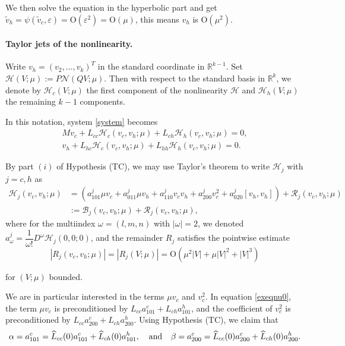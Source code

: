 \documentclass[10pt]{article}
\newcommand{\R}{\mathbb{R}}
\newcommand{\rmO}{\mathrm{O}}
\newcommand{\eps}{\varepsilon}
\newcommand{\Nl}{\mathcal{N}}
\newcommand{\B}{\mathcal{B}}
\newcommand{\Rm}{\mathcal{R}}
\begin{document}
We then solve the equation in the hyperbolic part and get $\tilde{v}_h = \psi(\tilde{v}_c,\eps) = \rmO(\eps^2)=\rmO(\mu)$, this means $v_h$ is $\rmO(\mu^2)$.
\fi

\paragraph{Taylor jets of the nonlinearity.} 
Write $v_h = (v_2,\ldots,v_{k})^T$ in the standard coordinate in $\R^{k-1}$. Set $\mathcal{H}(V;\mu) :=P\Nl(QV;\mu)$. Then with respect to the standard basis in $\R^k$, we denote by $\mathcal{H}_c(V;\mu)$ the first component of the nonlinearity $\mathcal{H}$ and $\mathcal{H}_h(V;\mu)$ the remaining $k-1$ components. 

In this notation, system \eqref{system} becomes
\begin{align}
M v_c + L_{cc}\mathcal{H}_c(v_c,v_h;\mu) + L_{ch}\mathcal{H}_h(v_c,v_h;\mu)= 0\label{exeqnu0},\\
v_h +  L_{hc}\mathcal{H}_c(v_c,v_h;\mu) + L_{hh}\mathcal{H}_h(v_c,v_h;\mu) = 0 \label{exeqnuh}.
\end{align}


By part $(i)$ of Hypothesis (TC), we may use Taylor's theorem to write $\mathcal{H}_j$ with $j=c,h$ as
\begin{align*}
\mathcal{H}_j(v_c,v_h;\mu) &=\left( a^j_{101} \mu v_c+a^j_{011}\mu v_h+a^j_{110}v_cv_h + a^j_{200}v_c^2+a^j_{020}[v_h,v_h] \right)+ \Rm_j(v_c,v_h;\mu)\\
&:= \B_j(v_c,v_h;\mu)+\Rm_j(v_c,v_h;\mu),
\end{align*}
where for the multiindex $\omega=(l,m,n)$ with $|\omega|=2$, we denoted $a^j_{\omega} = \dfrac{1}{\omega !}D^{\omega} \mathcal{H}_j(0,0;0)$, and the remainder $R_j$ satisfies the pointwise estimate
\begin{equation}\label{odR}
|R_j(v_c,v_h;\mu)| = |R_j(V;\mu)| = \rmO(\mu^2|V|+\mu|V|^2+|V|^3)
\end{equation} 


for $(V;\mu)$ bounded.

We are in particular interested in the terms $\mu v_c$ and $v_c^2$. In equation \eqref{exeqnu0}, the term $\mu v_c$ is preconditioned by $L_{cc}a_{101}^c+L_{ch}a_{101}^h$, and the coefficient of $v_c^2$ is preconditioned by $L_{cc}a_{200}^c+L_{ch}a_{200}^h$. Using Hypothesis (TC), we claim that
\[
\alpha = a_{101}^c =\widehat{L}_{cc}(0)a_{101}^c+\widehat{L}_{ch}(0)a_{101}^h , \hspace{0.1in}\text{ and }\hspace{0.1in}
\beta =a_{200}^c =\widehat{L}_{cc}(0)a_{200}^c+\widehat{L}_{ch}(0)a_{200}^h .
\]
\end{document}
